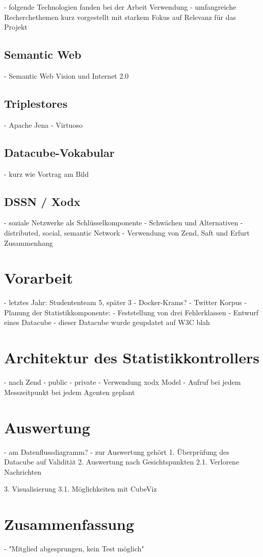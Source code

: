 \documentclass{article}
\begin{document}
- folgende Technologien fanden bei der Arbeit Verwendung
- umfangreiche Recherchethemen kurz vorgestellt mit starkem Fokus auf Relevanz für das Projekt

\subsection{Semantic Web}

- Semantic Web Vision und Internet 2.0


\subsection{Triplestores}

- Apache Jena
- Virtuoso

\subsection{Datacube-Vokabular}

- kurz wie Vortrag am Bild

\subsection{DSSN / Xodx}

- soziale Netzwerke als Schlüsselkomponente
- Schwächen und Alternativen
- distributed, social, semantic Network
- Verwendung von Zend, Saft und Erfurt Zusammenhang

\section{Vorarbeit}

- letztes Jahr: Studententeam 5, später 3
- Docker-Krams?
- Twitter Korpus
- Planung der Statistikkomponente:
	- Feststellung von drei Fehlerklassen
	- Entwurf eines Datacube
- dieser Datacube wurde geupdatet auf W3C blah


\section{Architektur des Statistikkontrollers}

- nach Zend
- public
- private
- Verwendung xodx Model
- Aufruf bei jedem Messzeitpunkt bei jedem Agenten geplant

\section{Auswertung}

- am Datenflussdiagramm?
- zur Auswertung gehört 
1. Überprüfung des Datacube auf Validität
2. Auswertung nach Gesichtspunkten
2.1. Verlorene Nachrichten

3. Visualisierung
3.1. Möglichkeiten mit CubeViz

\section{Zusammenfassung}

- "Mitglied abgesprungen, kein Test möglich"



\end{document}
